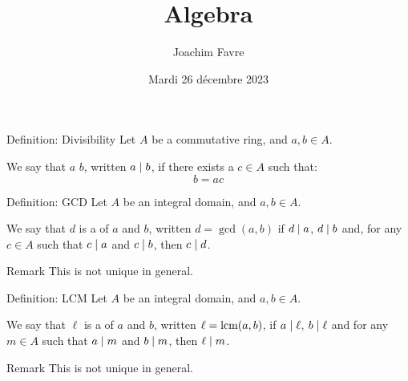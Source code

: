\documentclass[a4paper]{article}
\title{Algebra}
\author{Joachim Favre}
\date{Mardi 26 décembre 2023}
\begin{document}
\maketitle


\begin{parag}{Definition: Divisibility}
    Let $A$ be a commutative ring, and $a, b \in A$.

    We say that $a$  $b$, written $a \mid b$, if there exists a $c \in A$ such that: 
    \[b = ac\]
\end{parag}

\begin{parag}{Definition: GCD}
    Let $A$ be an integral domain, and $a, b \in A$.

    We say that $d$ is a  of $a$ and $b$, written $d = \gcd\left(a, b\right)$ if $d \mid a$, $d \mid b$ and, for any $c \in A$ such that $c \mid a$ and $c \mid b$, then $c \mid d$.

    \begin{subparag}{Remark}
        This is not unique in general.
    \end{subparag}
\end{parag}

\begin{parag}{Definition: LCM}
    Let $A$ be an integral domain, and $a, b \in A$.

    We say that $\ell$ is a  of $a$ and $b$, written $\ell = \lcm\left(a, b\right)$, if $a \mid \ell $, $b \mid \ell $ and for any $m \in A$ such that $a \mid m$ and $b \mid m$, then $\ell \mid m$.

    \begin{subparag}{Remark}
        This is not unique in general.
    \end{subparag}
\end{parag}
\end{document}
